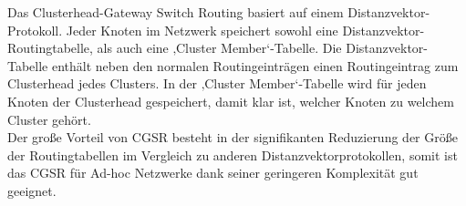 Das Clusterhead-Gateway Switch Routing basiert auf einem Distanzvektor-Protokoll. Jeder Knoten im Netzwerk speichert sowohl eine Distanzvektor-Routingtabelle, als auch eine ‚Cluster Member‘-Tabelle. Die Distanzvektor-Tabelle enthält neben den normalen Routingeinträgen einen Routingeintrag zum Clusterhead jedes Clusters. In der ‚Cluster Member‘-Tabelle wird für jeden Knoten der Clusterhead gespeichert, damit klar ist, welcher Knoten zu welchem Cluster gehört. \\

Der große Vorteil von CGSR besteht in der signifikanten Reduzierung der Größe der Routingtabellen im Vergleich zu anderen Distanzvektorprotokollen, somit ist das CGSR für Ad-hoc Netzwerke dank seiner geringeren Komplexität gut geeignet.

